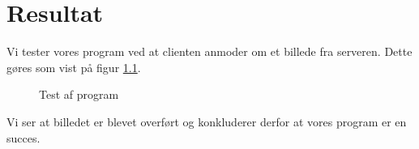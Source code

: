 \chapter{Resultat}

Vi tester vores program ved at clienten anmoder om et billede fra serveren. Dette gøres som vist på figur \ref{fig:testing}.

\begin{figure}[htbp]
	\centering
	\caption{Test af program}
	\label{fig:testing}
\end{figure}

Vi ser at billedet er blevet overført og konkluderer derfor at vores program er en succes.